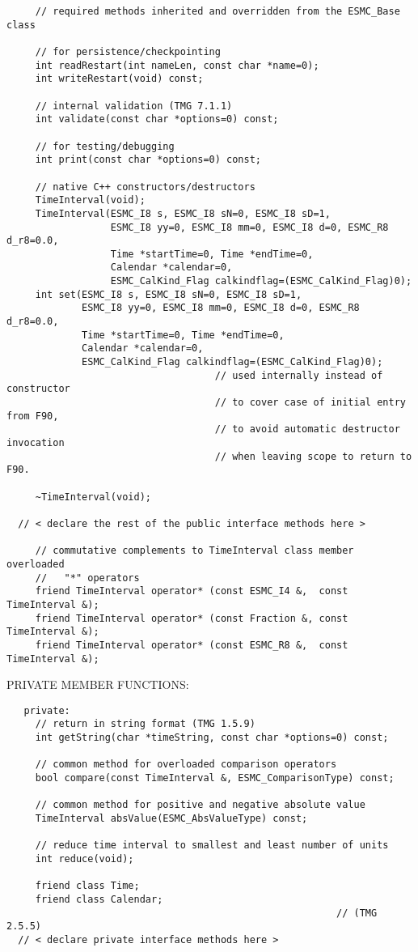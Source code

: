 \begin{verbatim}
     // required methods inherited and overridden from the ESMC_Base class
 
     // for persistence/checkpointing
     int readRestart(int nameLen, const char *name=0);
     int writeRestart(void) const;
 
     // internal validation (TMG 7.1.1)
     int validate(const char *options=0) const;
 
     // for testing/debugging
     int print(const char *options=0) const;
 
     // native C++ constructors/destructors
     TimeInterval(void);
     TimeInterval(ESMC_I8 s, ESMC_I8 sN=0, ESMC_I8 sD=1,
                  ESMC_I8 yy=0, ESMC_I8 mm=0, ESMC_I8 d=0, ESMC_R8 d_r8=0.0,
                  Time *startTime=0, Time *endTime=0,
                  Calendar *calendar=0,
                  ESMC_CalKind_Flag calkindflag=(ESMC_CalKind_Flag)0);
     int set(ESMC_I8 s, ESMC_I8 sN=0, ESMC_I8 sD=1,
             ESMC_I8 yy=0, ESMC_I8 mm=0, ESMC_I8 d=0, ESMC_R8 d_r8=0.0,
             Time *startTime=0, Time *endTime=0,
             Calendar *calendar=0,
             ESMC_CalKind_Flag calkindflag=(ESMC_CalKind_Flag)0);
                                    // used internally instead of constructor
                                    // to cover case of initial entry from F90,
                                    // to avoid automatic destructor invocation
                                    // when leaving scope to return to F90.
 
     ~TimeInterval(void);
 
  // < declare the rest of the public interface methods here >
 
     // commutative complements to TimeInterval class member overloaded
     //   "*" operators
     friend TimeInterval operator* (const ESMC_I4 &,  const TimeInterval &);
     friend TimeInterval operator* (const Fraction &, const TimeInterval &);
     friend TimeInterval operator* (const ESMC_R8 &,  const TimeInterval &);
 \end{verbatim}{\sf PRIVATE MEMBER FUNCTIONS:}
\begin{verbatim}   private:
     // return in string format (TMG 1.5.9)
     int getString(char *timeString, const char *options=0) const;
 
     // common method for overloaded comparison operators
     bool compare(const TimeInterval &, ESMC_ComparisonType) const;
 
     // common method for positive and negative absolute value
     TimeInterval absValue(ESMC_AbsValueType) const;
 
     // reduce time interval to smallest and least number of units
     int reduce(void);
 
     friend class Time;
     friend class Calendar;
                                                         // (TMG 2.5.5)
  // < declare private interface methods here >\end{verbatim}

\setlength{\parskip}{\oldparskip}
\setlength{\parindent}{\oldparindent}
\setlength{\baselineskip}{\oldbaselineskip}

